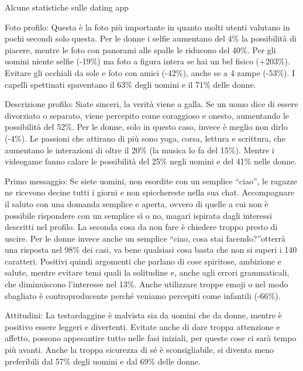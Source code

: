 \documentclass[12pt]{book} %
\begin{document}
\bigskip

\begin{mdframed}[linewidth=1pt]
Alcune statistiche sulle dating app

Foto profilo: Questa è la foto più importante in quanto molti utenti valutano in pochi secondi solo questa. Per le donne
i selfie aumentano del 4\% la possibilità di piacere, mentre le foto con panorami alle spalle le riducono del 40\%. Per
gli uomini niente selfie (-19\%) ma foto a figura intera se hai un bel fisico (+203\%). Evitare gli occhiali da sole e
foto con amici (-42\%), anche se a 4 zampe (-53\%). I capelli spettinati spaventano il 63\% degli uomini e il 71\%
delle donne. 

Descrizione profilo: Siate sinceri, la verità viene a galla. Se un uomo dice di essere divorziato o separato, viene
percepito come coraggioso e onesto, aumentando le possibilità del 52\%. Per le donne, solo in questo caso, invece è
meglio non dirlo (-4\%). Le passioni che attirano di più sono yoga, corsa, lettura e scrittura, che aumentano le
interazioni di oltre il 20\% (la musica lo fa del 15\%). Mentre i videogame fanno calare le possibilità del 25\% negli
uomini e del 41\% nelle donne.

Primo messaggio: Se siete uomini, non esordite con un semplice “ciao”, le ragazze ne ricevono decine tutti i giorni e
non spicchereste nella sua chat. Accompagnare il saluto con una domanda semplice e aperta, ovvero di quelle a cui non è
possibile rispondere con un semplice sì o no, magari ispirata dagli interessi descritti nel profilo. La seconda cosa da
non fare è chiedere troppo presto di uscire. Per le donne invece anche un semplice “ciao, cosa stai facendo?”otterrà
una risposta nel 98\% dei casi, va bene qualsiasi cosa basta che non si superi i 140 caratteri. Positivi quindi
argomenti che parlano di cose spiritose, ambizione e salute, mentre evitare temi quali la solitudine e, anche agli
errori grammaticali, che diminuiscono l'interesse nel 13\%. Anche utilizzare troppe emoji o nel modo sbagliato è
controproducente perché veniamo percepiti come infantili (-66\%).

Attitudini: La testardaggine è malvista sia da uomini che da donne, mentre è positivo essere leggeri e divertenti.
Evitate anche di dare troppa attenzione e affetto, possono appesantire tutto nelle fasi iniziali, per queste cose ci
sarà tempo più avanti. Anche la troppa sicurezza di sé è sconsigliabile, si diventa meno preferibili dal 57\% degli
uomini e dal 69\% delle donne.



\end{mdframed}
\end{document}
